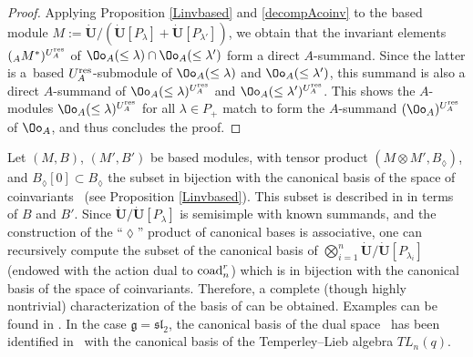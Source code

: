 \begin{proof}
 Applying Proposition \ref{Linvbased} and \eqref{decompAcoinv} to the based module $M:=\dot{\mathbf{U}} /(\dot{\mathbf{U}} [P_\lambda]+ \dot{\mathbf{U}} [P_{\lambda'}])$, we obtain that the invariant elements $({}_A M^*)^{U_A^{\rm res}}$ of $\Oo_A(\leq \lambda) \cap \Oo_A(\leq \lambda')$ form a direct $A$-summand. Since the latter is a~based $U_A^{\rm res}$-submodule of $ \Oo_A(\leq \lambda)$ and $\Oo_A(\leq \lambda')$, this summand is also a direct $A$-summand of $ \Oo_A(\leq \lambda)^{U_A^{\rm res}}$ and $\Oo_A(\leq \lambda')^{U_A^{\rm res}}$. This shows the $A$-modules $ \Oo_A(\leq \lambda)^{U_A^{\rm res}}$ for all $\lambda\in P_+$ match to form the $A$-summand $(\Oo_A)^{U_A^{\rm res}}$ of $\Oo_A$, and thus concludes the proof.
 \end{proof}

\begin{Remark} Let $(M,B)$, $(M', B')$ be based modules, with tensor product $(M\otimes M',B_{\lozenge})$, and $B_{\lozenge}[0]\subset B_{\lozenge}$ the subset in bijection with the canonical basis of the space of coinvariants~ (see Proposition \ref{Linvbased}). This subset is described in \cite[Proposition 27.3.8]{Lusztig} in terms of $B$ and $B'$. Since $\dot{\mathbf{U}} / \dot{\mathbf{U}} [P_{\lambda}]$ is semisimple with known summands, and the construction of the ``$\lozenge$'' product of canonical bases is associative, one can recursively compute the subset of the canonical basis of $\bigotimes_{i=1}^n \dot{\mathbf{U}} / \dot{\mathbf{U}} [P_{\lambda_i}]$ (endowed with the action dual to ${\rm coad}_n^r$) which is in bijection with the canonical basis of the space of coinvariants. Therefore, a complete (though highly nontrivial) characterization of the basis of  can be obtained. Examples can be found in \cite[Section~27.3.10]{Lusztig}. In the case $\mathfrak{g}={\mathfrak{sl}_2}$, the canonical basis of the dual space~ has been identified in~\cite{FK} with the canonical basis of the Temperley--Lieb algebra $TL_n(q)$.
\end{Remark}

